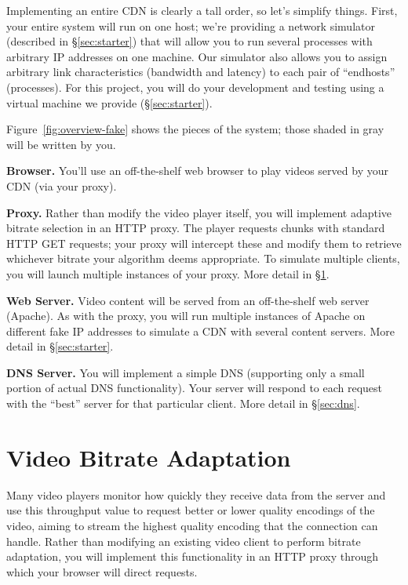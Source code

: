 \documentclass{article}
\begin{document}
Implementing an entire CDN is clearly a tall order, so let's simplify things.
First, your entire system will run on one host; we're providing a network
simulator (described in \S\ref{sec:starter}) that will allow you to run several
processes with arbitrary IP addresses on one machine. Our simulator also allows
you to assign arbitrary link characteristics (bandwidth and latency) to each
pair of ``endhosts'' (processes). For this project, you will do your
development and testing using a virtual machine we provide
(\S\ref{sec:starter}).

Figure~\ref{fig:overview-fake} shows the pieces of the system; those shaded in
gray will be written by you.

\medskip\noindent \textbf{Browser.} You'll use an off-the-shelf web browser to play
videos served by your CDN (via your proxy).

\medskip \noindent \textbf{Proxy.} Rather than modify the video player itself,
you will implement adaptive bitrate selection in an HTTP proxy. The player
requests chunks with standard HTTP GET requests; your proxy will intercept
these and modify them to retrieve whichever bitrate your algorithm deems
appropriate. To simulate multiple clients, you will launch multiple instances
of your proxy.  More detail in \S\ref{sec:proxy}.

\medskip \noindent \textbf{Web Server.} Video content will be served from an
off-the-shelf web server (Apache). As with the proxy, you will run multiple
instances of Apache on different fake IP addresses to simulate a CDN with
several content servers. More detail in \S\ref{sec:starter}.

\medskip \noindent \textbf{DNS Server.} You will implement a simple DNS (supporting only
a small portion of actual DNS functionality). Your server will respond to each
request with the ``best'' server for that particular client. More detail in
\S\ref{sec:dns}.




\section{Video Bitrate Adaptation}
\label{sec:proxy}

Many video players monitor how quickly they receive data from the server and
use this throughput value to request better or lower quality encodings of the
video, aiming to stream the highest quality encoding that the connection can
handle. Rather than modifying an existing video client to perform bitrate
adaptation, you will implement this functionality in an HTTP proxy through
which your browser will direct requests.
\end{document}
